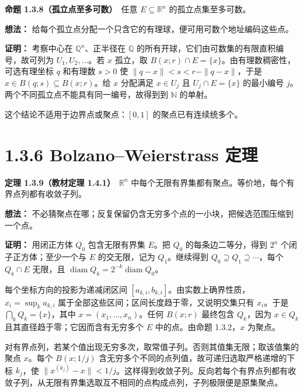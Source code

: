 \documentclass[11pt,a4paper]{article}
\begin{document}
\textbf{命题 1.3.8（孤立点至多可数）}　任意 \(E\subseteq\mathbb R^n\)
的孤立点集至多可数。

\textbf{想法：}
给每个孤立点分配一个只含它的有理球，便可用可数个地址编码这些点。

\textbf{证明：} 考察中心在 \(\mathbb Q^n\)、正半径在 \(\mathbb Q\)
的所有开球，它们由可数集的有限直积编号，故可列为 \(U_1,U_2,\ldots\)。若
\(x\) 孤立，取 \(B(x;r)\cap E=\{x\}\)。由有理数稠密性，可选有理坐标
\(q\) 和有理数 \(s>0\) 使 \(\|q-x\|<s<r-\|q-x\|\)，于是
\(x\in B(q;s)\subseteq B(x;r)\)。给 \(x\) 分配满足 \(x\in U_j\) 且
\(U_j\cap E=\{x\}\) 的最小编号
\(j\)。两个不同孤立点不能具有同一编号，故得到到 \(\mathbb N\) 的单射。

这个结论不适用于边界点或聚点：\([0,1]\) 的聚点已有连续统多个。

\section[\S{}1.3.6 Bolzano--Weierstrass
定理]{1.3.6 Bolzano--Weierstrass
定理}\label{bolzanoweierstrass-ux5b9aux7406}

\textbf{定理 1.3.9（教材定理 1.4.1）}　\(\mathbb R^n\)
中每个无限有界集都有聚点。等价地，每个有界点列都有收敛子列。

\textbf{想法：}
不必猜聚点在哪；反复保留仍含无穷多个点的一小块，把候选范围压缩到一个点。

\textbf{证明：} 用闭正方体 \(Q_0\) 包含无限有界集 \(E\)。把 \(Q_0\)
的每条边二等分，得到 \(2^n\) 个闭子正方体；至少一个与 \(E\)
的交无限，记为 \(Q_1\)。继续得到
\(Q_0\supseteq Q_1\supseteq\cdots\)，每个 \(Q_k\cap E\) 无限，且
\(\operatorname{diam}Q_k=2^{-k}\operatorname{diam}Q_0\)。

每个坐标方向的投影为递减闭区间
\([a_{k,i},b_{k,i}]\)。由实数上确界性质，\(x_i=\sup_k a_{k,i}\)
属于全部这些区间；区间长度趋于零，又说明交集只有 \(x_i\)。于是
\(\bigcap_kQ_k=\{x\}\)，其中 \(x=(x_1,\ldots,x_n)\)。任何 \(B(x;r)\)
最终包含 \(Q_k\)，因为 \(x\in Q_k\) 且其直径趋于零；它因而含有无穷多个
\(E\) 中的点。由命题 1.3.2，\(x\) 为聚点。

对有界点列，若某个值出现无穷多次，取常值子列。否则其值集无限；取该值集的聚点
\(x\)。每个 \(B(x;1/j)\)
含无穷多个不同的点列值，故可递归选取严格递增的下标 \(k_j\)，使
\(\|x^{(k_j)}-x\|<1/j\)。这样得到收敛子列。反向若每个有界点列都有收敛子列，从无限有界集选取互不相同的点构成点列，子列极限便是原集聚点。
\end{document}
